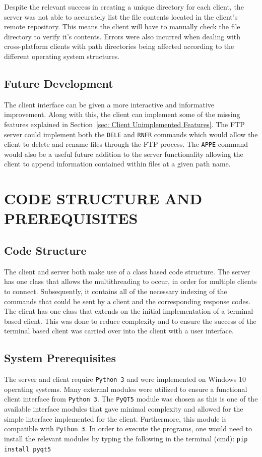 \documentclass[10pt, conference]{IEEEtran}
\def\code#1{\texttt{#1}}
\begin{document}
Despite the relevant success in creating a unique directory for each client, the server was not able to accurately list the file contents located in the client's remote repository. This means the client will have to manually check the file directory to verify it's contents. Errors were also incurred when dealing with cross-platform clients with path directories being affected according to the different operating system structures. 

\subsection{Future Development}
\label{sec: Future Development}
The client interface can be given a more interactive and informative improvement. Along with this, the client can implement some of the missing features explained in Section~\ref{sec: Client Unimplemented Features}. The FTP server could implement both the \texttt{DELE} and \texttt{RNFR} commands which would allow the client to delete and rename files through the FTP process. The \texttt{APPE} command would also be a useful future addition to the server functionality allowing the client to append information contained within files at a given path name.


%
\section{CODE STRUCTURE AND PREREQUISITES}
\label{sec: CODE STRUCTURE AND PREREQUISITES}

\subsection{Code Structure}
\label{sec: Code Structure}
The client and server both make use of a class based code structure. The server has one class that allows the multithreading to occur, in order for multiple clients to connect. Subsequently, it contains all of the necessary indexing of the commands that could be sent by a client and the corresponding response codes. The client has one class that extends on the initial implementation of a terminal-based client. This was done to reduce complexity and to ensure the success of the terminal based client was carried over into the client with a user interface.

\subsection{System Prerequisites}
\label{sec: System Prerequisites}
The server and client require \code{Python 3} and were implemented on Windows 10 operating systems. Many external modules were utilized to ensure a functional client interface from \code{Python 3}. The \code{PyQT5} module was chosen as this is one of the available interface modules that gave minimal complexity and allowed for the simple interface implemented for the client. Furthermore, this module is compatible with \code{Python 3}. In order to execute the programs, one would need to install the relevant modules by typing the following in the terminal (cmd): \code{pip install pyqt5}
\end{document}
